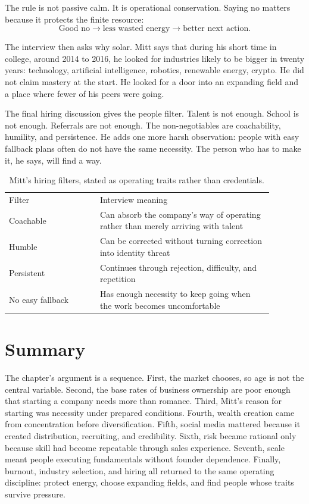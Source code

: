 The rule is not passive calm. It is operational conservation. Saying no matters because it protects the finite resource:
\begin{equation}
\text{Good no} \longrightarrow \text{less wasted energy} \longrightarrow \text{better next action}.
\end{equation}

The interview then asks why solar. Mitt says that during his short time in college, around 2014 to 2016, he looked for industries likely to be bigger in twenty years: technology, artificial intelligence, robotics, renewable energy, crypto. He did not claim mastery at the start. He looked for a door into an expanding field and a place where fewer of his peers were going.

The final hiring discussion gives the people filter. Talent is not enough. School is not enough. Referrals are not enough. The non-negotiables are coachability, humility, and persistence. He adds one more harsh observation: people with easy fallback plans often do not have the same necessity. The person who has to make it, he says, will find a way.

\begin{table}
\centering
\begin{tabular}{p{0.30\linewidth}p{0.58\linewidth}}
Filter & Interview meaning \\
Coachable & Can absorb the company's way of operating rather than merely arriving with talent \\
Humble & Can be corrected without turning correction into identity threat \\
Persistent & Continues through rejection, difficulty, and repetition \\
No easy fallback & Has enough necessity to keep going when the work becomes uncomfortable \\
\end{tabular}
\caption{Mitt's hiring filters, stated as operating traits rather than credentials.}
\end{table}

\section{Summary}

The chapter's argument is a sequence. First, the market chooses, so age is not the central variable. Second, the base rates of business ownership are poor enough that starting a company needs more than romance. Third, Mitt's reason for starting was necessity under prepared conditions. Fourth, wealth creation came from concentration before diversification. Fifth, social media mattered because it created distribution, recruiting, and credibility. Sixth, risk became rational only because skill had become repeatable through sales experience. Seventh, scale meant people executing fundamentals without founder dependence. Finally, burnout, industry selection, and hiring all returned to the same operating discipline: protect energy, choose expanding fields, and find people whose traits survive pressure.